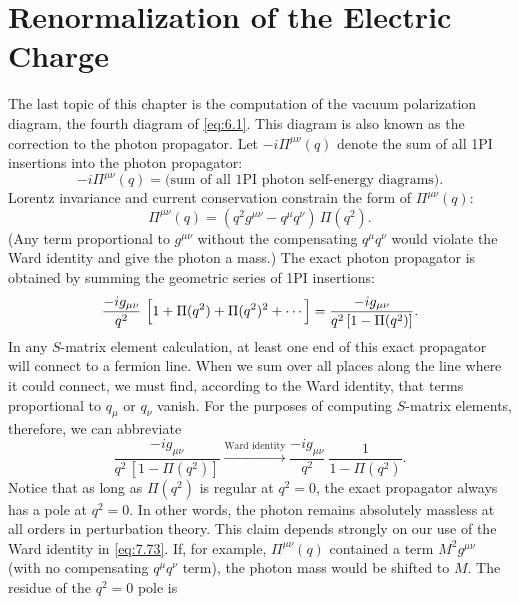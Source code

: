 \section{Renormalization of the Electric Charge}

The last topic of this chapter is the computation of the vacuum polarization
diagram, the fourth diagram of \eqref{eq:6.1}.  This diagram is also known as
the correction to the photon propagator.  Let
$-i\Pi^{\mu\nu}(q)$ denote the sum of all 1PI insertions into the photon
propagator:
\begin{equation}
  -i\Pi^{\mu\nu}(q) = \text{(sum of all 1PI photon self-energy diagrams)} .
  \label{eq:7.71}
\end{equation}
Lorentz invariance and current conservation constrain the form of
$\Pi^{\mu\nu}(q)$:
\begin{equation}
  \Pi^{\mu\nu}(q) = (q^2g^{\mu\nu} - q^\mu q^\nu)\,\Pi(q^2) .
  \label{eq:7.72}
\end{equation}
(Any term proportional to $g^{\mu\nu}$ without the compensating $q^\mu q^\nu$
would violate the Ward identity and give the photon a mass.)  The exact photon
propagator is obtained by summing the geometric series of 1PI insertions:
\begin{equation}
  \frac{-ig_{\mu\nu}}{q^2}\ \Bigl[ 1 + \Pi(q^2) + \Pi(q^2)^2 + \cdots \Bigr]
  = \frac{-ig_{\mu\nu}}{q^2\,[1 - \Pi(q^2)]} .
  \label{eq:7.73}
\end{equation}
In any $S$-matrix element calculation, at least one end of this exact
propagator will connect to a fermion line.  When we sum over all places along
the line where it could connect, we must find, according to the Ward identity,
that terms proportional to $q_\mu$ or $q_\nu$ vanish.  For the purposes of
computing $S$-matrix elements, therefore, we can abbreviate
\begin{equation}
  \frac{-ig_{\mu\nu}}{q^2\,[1-\Pi(q^2)]}
  \xrightarrow{\text{Ward identity}}
  \frac{-ig_{\mu\nu}}{q^2}\ \frac{1}{1-\Pi(q^2)} .
  \label{eq:7.75}
\end{equation}
Notice that as long as $\Pi(q^2)$ is regular at $q^2 = 0$, the exact
propagator always has a pole at $q^2 = 0$.  In other words, the photon remains
absolutely massless at all orders in perturbation theory.  This claim depends
strongly on our use of the Ward identity in \eqref{eq:7.73}.  If, for example,
$\Pi^{\mu\nu}(q)$ contained a term $M^2g^{\mu\nu}$ (with no compensating
$q^\mu q^\nu$ term), the photon mass would be shifted to $M$.  The residue of
the $q^2 = 0$ pole is
